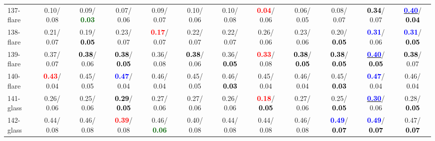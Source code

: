\begin{table}[h]
\begin{center}
{\begin{tabular}{lc|c|c|c|c|c|c|c|c|c|c}
137-flare &   0.10/  0.08 &   0.09/\textcolor{darkgreen}{\textbf{  0.03}} &   0.07/  0.06 &   0.09/  0.07 &   0.10/  0.06 &   0.10/  0.08 & \textcolor{red}{\textbf{  0.04}}/  0.06 &   0.06/  0.05 &   0.08/  0.07 & \textcolor{black}{\textbf{  0.34}}/  0.07 & \underline{\textcolor{blue}{\textbf{  0.40}}}/\textcolor{black}{\textbf{  0.04}} \\
138-flare &   0.21/  0.07 &   0.19/\textcolor{black}{\textbf{  0.05}} &   0.23/  0.07 & \textcolor{red}{\textbf{  0.17}}/  0.07 &   0.22/  0.07 &   0.22/  0.07 &   0.26/  0.06 &   0.23/  0.06 &   0.20/\textcolor{black}{\textbf{  0.05}} & \textcolor{blue}{\textbf{  0.31}}/  0.06 & \textcolor{blue}{\textbf{  0.31}}/\textcolor{black}{\textbf{  0.05}} \\
139-flare &   0.37/  0.07 & \textcolor{black}{\textbf{  0.38}}/  0.06 & \textcolor{black}{\textbf{  0.38}}/\textcolor{black}{\textbf{  0.05}} &   0.36/  0.08 & \textcolor{black}{\textbf{  0.38}}/  0.06 &   0.36/\textcolor{black}{\textbf{  0.05}} & \textcolor{red}{\textbf{  0.33}}/  0.08 & \textcolor{black}{\textbf{  0.38}}/\textcolor{black}{\textbf{  0.05}} & \textcolor{black}{\textbf{  0.38}}/\textcolor{black}{\textbf{  0.05}} & \underline{\textcolor{blue}{\textbf{  0.40}}}/\textcolor{black}{\textbf{  0.05}} & \textcolor{black}{\textbf{  0.38}}/  0.07 \\
140-flare & \textcolor{red}{\textbf{  0.43}}/  0.04 &   0.45/  0.05 & \textcolor{blue}{\textbf{  0.47}}/  0.04 &   0.46/  0.04 &   0.45/  0.05 &   0.46/\textcolor{black}{\textbf{  0.03}} &   0.45/  0.04 &   0.46/  0.04 &   0.45/\textcolor{black}{\textbf{  0.03}} & \textcolor{blue}{\textbf{  0.47}}/  0.04 &   0.46/  0.04 \\
141-glass &   0.26/  0.06 &   0.25/  0.06 & \textcolor{black}{\textbf{  0.29}}/\textcolor{black}{\textbf{  0.05}} &   0.27/  0.06 &   0.27/  0.06 &   0.26/  0.06 & \textcolor{red}{\textbf{  0.18}}/\textcolor{black}{\textbf{  0.05}} &   0.27/  0.06 &   0.25/\textcolor{black}{\textbf{  0.05}} & \underline{\textcolor{blue}{\textbf{  0.30}}}/  0.06 &   0.28/\textcolor{black}{\textbf{  0.05}} \\
142-glass &   0.44/  0.08 &   0.46/  0.08 & \textcolor{red}{\textbf{  0.39}}/  0.08 &   0.46/\textcolor{darkgreen}{\textbf{  0.06}} &   0.40/  0.08 &   0.44/  0.08 &   0.44/  0.08 &   0.46/  0.08 & \textcolor{blue}{\textbf{  0.49}}/\textcolor{black}{\textbf{  0.07}} & \textcolor{blue}{\textbf{  0.49}}/\textcolor{black}{\textbf{  0.07}} &   0.47/\textcolor{black}{\textbf{  0.07}} \\ \hline

\end{tabular}}
\end{center}
\end{table}
